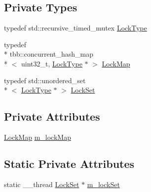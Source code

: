 \subsection*{Private Types}
\begin{DoxyCompactItemize}
\item 
typedef std\-::recursive\-\_\-timed\-\_\-mutex \hyperlink{classLockKey_a1d353f7485eb028eba4f8d8b310671d2}{Lock\-Type}
\item 
typedef \\*
tbb\-::concurrent\-\_\-hash\-\_\-map\\*
$<$ uint32\-\_\-t, \hyperlink{classLockKey_a1d353f7485eb028eba4f8d8b310671d2}{Lock\-Type} $\ast$ $>$ \hyperlink{classLockKey_ac1fcdfbaee1acc65af16330619a8da6b}{Lock\-Map}
\item 
typedef std\-::unordered\-\_\-set\\*
$<$ \hyperlink{classLockKey_a1d353f7485eb028eba4f8d8b310671d2}{Lock\-Type} $\ast$ $>$ \hyperlink{classLockKey_ac9cd4ebc6a682f3f1e879d89062af047}{Lock\-Set}
\end{DoxyCompactItemize}
\subsection*{Private Attributes}
\begin{DoxyCompactItemize}
\item 
\hyperlink{classLockKey_ac1fcdfbaee1acc65af16330619a8da6b}{Lock\-Map} \hyperlink{classLockKey_ab2c69fd900b76bbe73d61113fd72a649}{m\-\_\-lock\-Map}
\end{DoxyCompactItemize}
\subsection*{Static Private Attributes}
\begin{DoxyCompactItemize}
\item 
static \-\_\-\-\_\-thread \hyperlink{classLockKey_ac9cd4ebc6a682f3f1e879d89062af047}{Lock\-Set} $\ast$ \hyperlink{classLockKey_a0ab7ba3859ccae1c1e8b20c3203fe6ba}{m\-\_\-lock\-Set}
\end{DoxyCompactItemize}


